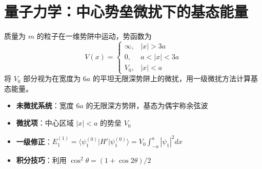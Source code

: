 \section{量子力学：中心势垒微扰下的基态能量}
\label{sec:center-barrier-perturbation}

\begin{modelbox}[题目：中心势垒微扰下的基态能量]
质量为 $m$ 的粒子在一维势阱中运动，势函数为
\[
V(x)=\begin{cases}\infty, & |x|>3a \\ 0, & a<|x|<3a \\ V_0, & |x|<a\end{cases}
\]
将 $V_0$ 部分视为在宽度为 $6a$ 的平坦无限深势阱上的微扰，用一级微扰方法计算基态能量。
\end{modelbox}

\begin{tipbox}[考点快速分析]
\begin{itemize}
    \item \textbf{未微扰系统}：宽度 $6a$ 的无限深方势阱，基态为偶宇称余弦波
    \item \textbf{微扰项}：中心区域 $|x|<a$ 的势垒 $V_0$
    \item \textbf{一级修正}：$E_1^{(1)}=\langle\psi_1^{(0)}|H'|\psi_1^{(0)}\rangle=V_0\int_{-a}^{a}|\psi_1|^2dx$
    \item \textbf{积分技巧}：利用 $\cos^2\theta=(1+\cos2\theta)/2$
\end{itemize}
\end{tipbox}

